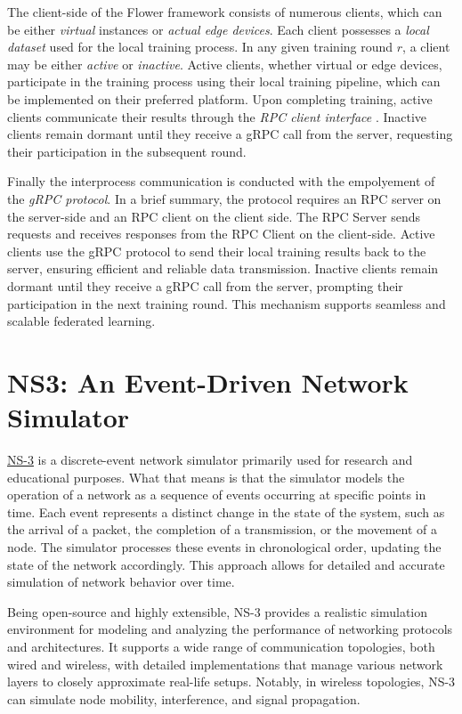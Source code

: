The client-side of the Flower framework consists of numerous clients, which can be either \emph{virtual} instances or \emph{actual edge devices}. Each client possesses a
\emph{local dataset} used for the local training process. In any given training round $r$, a client may be either \emph{active} or \emph{inactive}. Active clients, whether virtual or edge devices,
participate in the training process using their local training pipeline, which can be implemented on their preferred platform. Upon completing training, active clients
communicate their results through the \emph{RPC client interface} . Inactive clients remain dormant until they receive a gRPC call from the server, requesting their participation
in the subsequent round.

Finally the interprocess communication is conducted with the empolyement of the \emph{gRPC protocol}. In a brief summary, the protocol requires an RPC server on
the server-side and an RPC client on the client side. The RPC Server sends requests and receives responses from the RPC Client on the client-side.
Active clients use the gRPC protocol to send their local training results back to the server, ensuring efficient and reliable data transmission.
Inactive clients remain dormant until they receive a gRPC call from the server, prompting their participation in the next training round.
This mechanism supports seamless and scalable federated learning.

\section{NS3: An Event-Driven Network Simulator}
\label{sec:ns3}
\href{https://www.nsnam.org/}{NS-3} is a discrete-event network simulator primarily used for research and educational purposes. What that means is that the simulator
models the operation of a network as a sequence of events occurring at specific points in time. Each event represents a distinct change in the state of the system,
such as the arrival of a packet, the completion of a transmission, or the movement of a node. The simulator processes these events in chronological order, updating
the state of the network accordingly. This approach allows for detailed and accurate simulation of network behavior over time.

Being open-source and highly extensible, NS-3 provides a realistic simulation environment for modeling and analyzing the performance of networking protocols and architectures.
It supports a wide range of communication topologies, both wired and wireless, with detailed implementations that manage various network layers to closely approximate
real-life setups. Notably, in wireless topologies, NS-3 can simulate node mobility, interference, and signal propagation.

